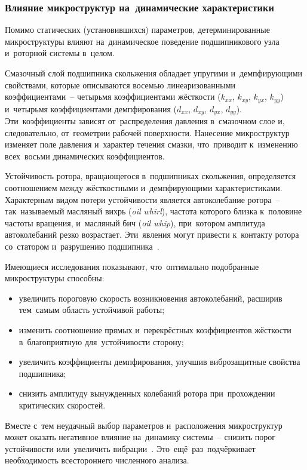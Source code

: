 \subsubsection{Влияние микроструктур на~динамические характеристики}

Помимо статических (установившихся) параметров, детерминированные микроструктуры влияют на~динамическое поведение подшипникового узла и~роторной системы в~целом.

Смазочный слой подшипника скольжения обладает упругими и~демпфирующими свойствами, которые описываются восемью линеаризованными коэффициентами~-- четырьмя коэффициентами жёсткости ($k_{xx}$, $k_{xy}$, $k_{yx}$, $k_{yy}$) и~четырьмя коэффициентами демпфирования ($d_{xx}$, $d_{xy}$, $d_{yx}$, $d_{yy}$). Эти~коэффициенты зависят от~распределения давления в~смазочном слое и, следовательно, от~геометрии рабочей поверхности. Нанесение микроструктур изменяет поле давления и~характер течения смазки, что~приводит к~изменению всех~восьми динамических коэффициентов.

Устойчивость ротора, вращающегося в~подшипниках скольжения, определяется соотношением между жёсткостными и~демпфирующими характеристиками. Характерным видом потери устойчивости является автоколебание ротора~-- так~называемый масляный вихрь (\textit{oil whirl}), частота которого близка к~половине частоты вращения, и~масляный бич (\textit{oil whip}), при~котором амплитуда автоколебаний резко возрастает. Эти~явления могут привести к~контакту ротора со~статором и~разрушению подшипника~\cite{muszynska1988,goodwin1997}.

Имеющиеся исследования показывают, что~оптимально подобранные микроструктуры способны:
\begin{itemize}
\item увеличить пороговую скорость возникновения автоколебаний, расширив тем~самым область устойчивой работы;
\item изменить соотношение прямых и~перекрёстных коэффициентов жёсткости в~благоприятную для~устойчивости сторону;
\item увеличить коэффициенты демпфирования, улучшив виброзащитные свойства подшипника;
\item снизить амплитуду вынужденных колебаний ротора при~прохождении критических скоростей.
\end{itemize}

Вместе с~тем неудачный выбор параметров и~расположения микроструктур может оказать негативное влияние на~динамику системы~-- снизить порог устойчивости или~увеличить вибрации~\cite{rebufa2017}. Это~ещё~раз~подчёркивает необходимость всестороннего численного анализа.

